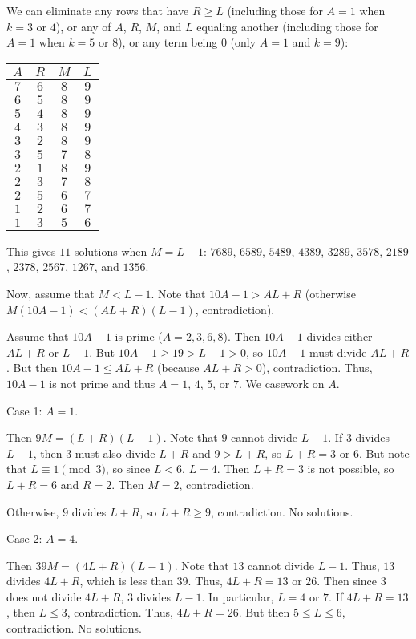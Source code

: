 We can eliminate any rows that have $R\geq L$ (including those for $A=1$ when $k=3$ or $4$), or any of $A$, $R$, $M$, and $L$ equaling another (including those for $A=1$ when $k=5$ or $8$), or any term being $0$ (only $A=1$ and $k=9$):

\begin{center}
\begin{tabular}{c|c|c|c} 
$A$ & $R$ & $M$ & $L$ \\ \hline
$7$ & $6$ & $8$ & $9$ \\
$6$ & $5$ & $8$ & $9$ \\
$5$ & $4$ & $8$ & $9$ \\
$4$ & $3$ & $8$ & $9$ \\
$3$ & $2$ & $8$ & $9$ \\
$3$ & $5$ & $7$ & $8$ \\
$2$ & $1$ & $8$ & $9$ \\
$2$ & $3$ & $7$ & $8$ \\
$2$ & $5$ & $6$ & $7$ \\
$1$ & $2$ & $6$ & $7$ \\
$1$ & $3$ & $5$ & $6$ \\
\end{tabular}
\end{center}

This gives $11$ solutions when $M=L-1$: $7689$, $6589$, $5489$, $4389$, $3289$, $3578$, $2189$, $2378$, $2567$, $1267$, and $1356$.

Now, assume that $M<L-1$. Note that $10A-1>AL+R$ (otherwise $M\left(10A-1\right)<\left(AL+R\right)\left(L-1\right)$, contradiction).

Assume that $10A-1$ is prime ($A=2,3,6,8$). Then $10A-1$ divides either $AL+R$ or $L-1$. But $10A-1\geq19>L-1>0$, so $10A-1$ must divide $AL+R$. But then $10A-1\leq AL+R$ (because $AL+R>0$), contradiction. Thus, $10A-1$ is not prime and thus $A=1$, $4$, $5$, or $7$. We casework on $A$.

Case 1: $A=1$.

Then $9M=\left(L+R\right)\left(L-1\right)$. Note that $9$ cannot divide $L-1$. If $3$ divides $L-1$, then $3$ must also divide $L+R$ and $9>L+R$, so $L+R=3$ or $6$. But note that $L\equiv1\pmod3$, so since $L<6$, $L=4$. Then $L+R=3$ is not possible, so $L+R=6$ and $R=2$. Then $M=2$, contradiction.

Otherwise, $9$ divides $L+R$, so $L+R\geq9$, contradiction. No solutions.

Case 2: $A=4$.

Then $39M=\left(4L+R\right)\left(L-1\right)$. Note that $13$ cannot divide $L-1$. Thus, $13$ divides $4L+R$, which is less than $39$. Thus, $4L+R=13$ or $26$. Then since $3$ does not divide $4L+R$, $3$ divides $L-1$. In particular, $L=4$ or $7$. If $4L+R=13$, then $L\leq3$, contradiction. Thus, $4L+R=26$. But then $5\leq L\leq6$, contradiction. No solutions.

